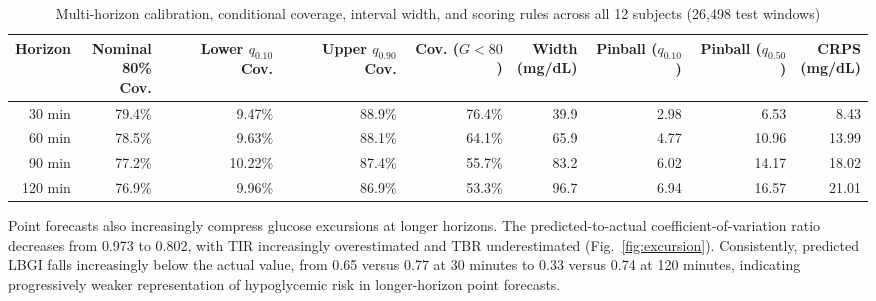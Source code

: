 \documentclass[journal]{IEEEtran}
\begin{document}
\begin{table}[t]
\centering
\caption{Multi-horizon calibration, conditional coverage, interval width, and scoring rules across all 12 subjects (26,498 test windows)}
\label{tab:calibration}
\footnotesize
\begin{tabular}{rrrrrrrrr}
\toprule
Horizon & \makecell{Nominal\\80\% Cov.} & \makecell{Lower\\$q_{0.10}$ Cov.} & \makecell{Upper\\$q_{0.90}$ Cov.} & \makecell{Cov.\\($G<80$)} & \makecell{Width\\(mg/dL)} & \makecell{Pinball\\($q_{0.10}$)} & \makecell{Pinball\\($q_{0.50}$)} & \makecell{CRPS\\(mg/dL)} \\
\midrule
30 min  & 79.4\% & 9.47\%  & 88.9\% & 76.4\% & 39.9 & 2.98 & 6.53  & 8.43 \\
60 min  & 78.5\% & 9.63\%  & 88.1\% & 64.1\% & 65.9 & 4.77 & 10.96 & 13.99 \\
90 min  & 77.2\% & 10.22\% & 87.4\% & 55.7\% & 83.2 & 6.02 & 14.17 & 18.02 \\
120 min & 76.9\% & 9.96\%  & 86.9\% & 53.3\% & 96.7 & 6.94 & 16.57 & 21.01 \\
\bottomrule
\end{tabular}
\end{table}



Point forecasts also increasingly compress glucose excursions at longer horizons. The predicted-to-actual coefficient-of-variation ratio decreases from 0.973 to 0.802, with TIR increasingly overestimated and TBR underestimated (Fig.~\ref{fig:excursion}). Consistently, predicted LBGI falls increasingly below the actual value, from 0.65 versus 0.77 at 30 minutes to 0.33 versus 0.74 at 120 minutes, indicating progressively weaker representation of hypoglycemic risk in longer-horizon point forecasts.
\end{document}
